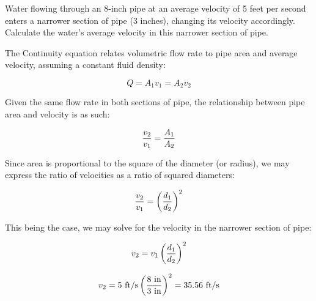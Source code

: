 

Water flowing through an 8-inch pipe at an average velocity of 5 feet per second enters a narrower section of pipe (3 inches), changing its velocity accordingly.  Calculate the water's average velocity in this narrower section of pipe.







The Continuity equation relates volumetric flow rate to pipe area and average velocity, assuming a constant fluid density:

$$Q = A_1 v_1 = A_2 v_2$$

Given the same flow rate in both sections of pipe, the relationship between pipe area and velocity is as such:

$${v_2 \over v_1} = {A_1 \over A_2}$$

Since area is proportional to the square of the diameter (or radius), we may express the ratio of velocities as a ratio of squared diameters:
 
$${v_2 \over v_1} = \left({d_1 \over d_2}\right)^2$$

This being the case, we may solve for the velocity in the narrower section of pipe:

$$v_2 = v_1 \left({d_1 \over d_2}\right)^2$$

$$v_2 = 5 \hbox{ ft/s} \left({8 \hbox{ in} \over 3 \hbox{ in}}\right)^2 = 35.56 \hbox{ ft/s}$$











